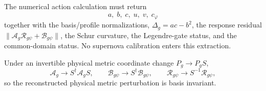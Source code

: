 The numerical action calculation must return
\begin{equation}
\boxed{
a,\;b,\;c,\;u,\;v,\;c_\varphi
}
\end{equation}
together with the basis/profile normalizations, $\Delta_g=ac-b^2$, the
response residual
$\|\mathcal A_g\mathcal R_{g\psi}+\mathcal B_{g\psi}\|$, the Schur curvature,
the Legendre-gate status, and the common-domain status.  No supernova
calibration enters this extraction.

Under an invertible physical metric coordinate change $P_g\to P_gS$,
\begin{equation}
\mathcal A_g\to S^\dagger\mathcal A_gS,
\qquad
\mathcal B_{g\psi}\to S^\dagger\mathcal B_{g\psi},
\qquad
\mathcal R_{g\psi}\to S^{-1}\mathcal R_{g\psi},
\end{equation}
so the reconstructed physical metric perturbation is basis invariant.
